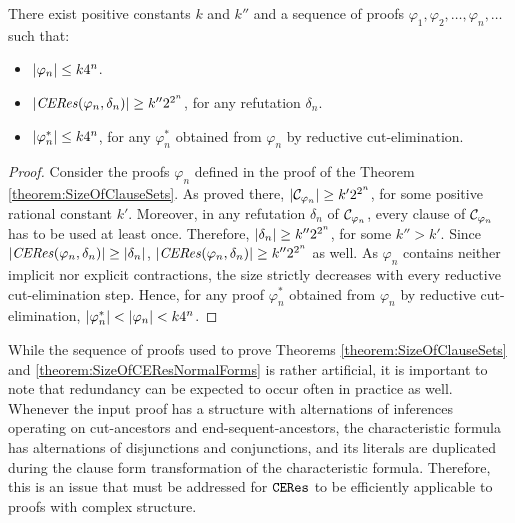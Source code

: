 \begin{theorem}
\label{theorem:SizeOfCEResNormalForms}
There exist positive constants $k$ and $k''$ and a sequence of proofs $\varphi_1, \varphi_2, \ldots, \varphi_n, \ldots$ such that:
\begin{itemize}
\item $|\varphi_n| \leq k 4^n$.
\item $|\mathit{CERes}(\varphi_n,\delta_n)| \geq k'' 2^{2^n}$, for any refutation $\delta_n$.
\item $|\varphi_n^*| \leq k 4^n$, for any $\varphi_n^*$ obtained from $\varphi_n$ by reductive cut-elimination.
\end{itemize}
\end{theorem}
\begin{proof}
Consider the proofs $\varphi_n$ defined in the proof of the Theorem \ref{theorem:SizeOfClauseSets}. As proved there, 
$|\mathcal{C}_{\varphi_n}| \geq k' 2^{2^n}$, for some positive rational constant $k'$. Moreover, in any refutation $\delta_n$ of $\mathcal{C}_{\varphi_n}$, every clause of $\mathcal{C}_{\varphi_n}$ has to be used at least once. Therefore, $|\delta_n| \geq k'' 2^{2^n}$, for some $k'' > k'$. Since $|\mathit{CERes}(\varphi_n,\delta_n)| \geq |\delta_n|$, $|\mathit{CERes}(\varphi_n,\delta_n)| \geq k'' 2^{2^n}$ as well. As $\varphi_n$ contains neither implicit nor explicit contractions, the size strictly decreases with every reductive cut-elimination step. Hence, for any proof $\varphi_n^*$ obtained from $\varphi_n$ by reductive cut-elimination, $|\varphi_n^*| < |\varphi_n| < k 4^n$.
\hfill\QED
\end{proof}

\noindent
While the sequence of proofs used to prove Theorems \ref{theorem:SizeOfClauseSets} and \ref{theorem:SizeOfCEResNormalForms} is rather artificial, it is important to note that redundancy can be expected to occur often in practice as well. Whenever the input proof has a structure with alternations of inferences operating on cut-ancestors and end-sequent-ancestors, the characteristic formula has alternations of disjunctions and conjunctions, and its literals are duplicated during the clause form transformation of the characteristic formula. Therefore, this is an issue that must be addressed for $\texttt{CERes}$ to be efficiently applicable to proofs with complex structure.
